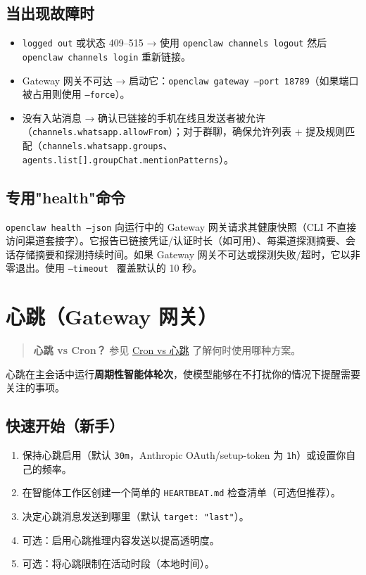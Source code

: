 \subsection{当出现故障时}


\begin{itemize}
  \item \texttt{logged out} 或状态 409–515 → 使用 \texttt{openclaw channels logout} 然后 \texttt{openclaw channels login} 重新链接。
  \item Gateway 网关不可达 → 启动它：\texttt{openclaw gateway --port 18789}（如果端口被占用则使用 \texttt{--force}）。
  \item 没有入站消息 → 确认已链接的手机在线且发送者被允许（\texttt{channels.whatsapp.allowFrom}）；对于群聊，确保允许列表 + 提及规则匹配（\texttt{channels.whatsapp.groups}、\texttt{agents.list[].groupChat.mentionPatterns}）。
\end{itemize}


\subsection{专用"health"命令}


\texttt{openclaw health --json} 向运行中的 Gateway 网关请求其健康快照（CLI 不直接访问渠道套接字）。它报告已链接凭证/认证时长（如可用）、每渠道探测摘要、会话存储摘要和探测持续时间。如果 Gateway 网关不可达或探测失败/超时，它以非零退出。使用 \texttt{--timeout } 覆盖默认的 10 秒。


\clearpage

\section{心跳（Gateway 网关）}


\begin{quote}
\textbf{心跳 vs Cron？} 参见 \href{/automation/cron-vs-heartbeat}{Cron vs 心跳} 了解何时使用哪种方案。
\end{quote}


心跳在主会话中运行\textbf{周期性智能体轮次}，使模型能够在不打扰你的情况下提醒需要关注的事项。

\subsection{快速开始（新手）}


\begin{enumerate}
  \item 保持心跳启用（默认 \texttt{30m}，Anthropic OAuth/setup-token 为 \texttt{1h}）或设置你自己的频率。
  \item 在智能体工作区创建一个简单的 \texttt{HEARTBEAT.md} 检查清单（可选但推荐）。
  \item 决定心跳消息发送到哪里（默认 \texttt{target: "last"}）。
  \item 可选：启用心跳推理内容发送以提高透明度。
  \item 可选：将心跳限制在活动时段（本地时间）。
\end{enumerate}


